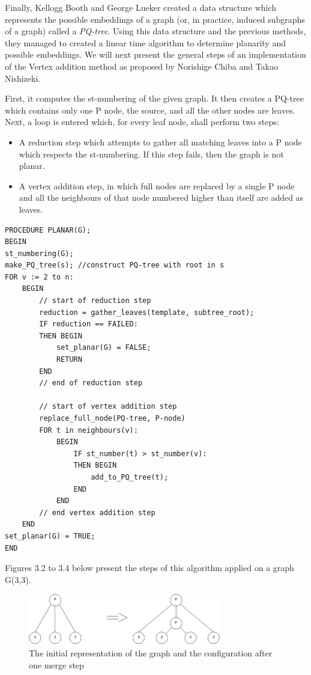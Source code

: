 Finally, Kellogg Booth and George Lueker created a data structure which represents the possible embeddings of a graph 
(or, in practice, induced subgraphs of a graph) called a \emph{PQ-tree}. Using this data structure and the previous methods, 
they managed to created a linear time algorithm to determine planarity and possible embeddings. We will next present 
the general steps of an implementation of the Vertex addition method as proposed by Norishige Chiba and Takao Nishizeki\cite{chiba}.

First, it computes the st-numbering of the given graph. It then creates a PQ-tree which contains only one P node, the 
source, and all the other nodes are leaves. Next, a loop is entered which, for every leaf node, shall perform two steps:

\begin{itemize}
\item A reduction step which attempts to gather all matching leaves into a P node which respects the st-numbering. If this 
step fails, then the graph is not planar.
\item A vertex addition step, in which full nodes are replaced by a single P node and all the neighbours of that node 
numbered higher than itself are added as leaves.
\end{itemize}

\begin{lstlisting}[caption={Vertex addition algorithm as proposed by Chiba and Nishizieki}]
PROCEDURE PLANAR(G);
BEGIN
st_numbering(G);
make_PQ_tree(s); //construct PQ-tree with root in s
FOR v := 2 to n:
	BEGIN
		// start of reduction step
		reduction = gather_leaves(template, subtree_root);
		IF reduction == FAILED:
		THEN BEGIN
			set_planar(G) = FALSE;
			RETURN
		END
		// end of reduction step
			
		// start of vertex addition step
		replace_full_node(PQ-tree, P-node)
		FOR t in neighbours(v):
			BEGIN
				IF st_number(t) > st_number(v):
				THEN BEGIN
					add_to_PQ_tree(t);
				END
			END
		// end vertex addition step
	END
set_planar(G) = TRUE;
END
\end{lstlisting}



Figures 3.2 to 3.4 below present the steps of this algorithm applied on a graph G(3,3).

\begin{figure}[ht] \centering
\includegraphics[width=0.75\textwidth]{img/algdesing/vertex_reduction_step_1.png}
\caption{The initial representation of the graph and the configuration after one merge step} \end{figure}


